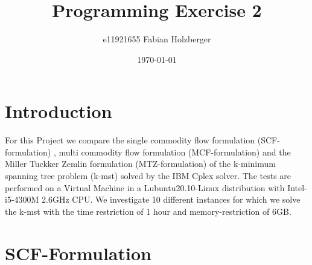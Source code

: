 \documentclass[11pt]{article}
\title{Programming Exercise 2}
\author{e11921655 Fabian Holzberger}
\date{\today}
\begin{document}
\graphicspath{{./figures/}}
\maketitle

%
\section{Introduction}
For this Project we compare the single commodity flow formulation (SCF-formulation) , multi commodity flow formulation (MCF-formulation) and the Miller Tuckker Zemlin formulation (MTZ-formulation) of the k-minimum spanning tree problem (k-mst) solved by the IBM Cplex solver. The tests are performed on a Virtual Machine in a Lubuntu20.10-Linux distribution with Intel-i5-4300M 2.6GHz CPU. We investigate 10 different instances for which we solve the k-mst with the time restriction of 1 hour and memory-restriction of 6GB.
\section{SCF-Formulation}
\end{document}
